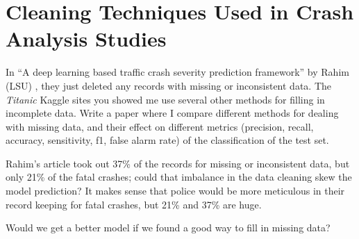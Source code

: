\section{Cleaning Techniques Used in Crash Analysis Studies}


In ``A deep learning based traffic crash severity prediction framework'' by Rahim (LSU) \cite{RAHIM2021106090}, they just deleted any records with missing or inconsistent data.  The {\it Titanic} Kaggle sites you showed me use several other methods for filling in incomplete data.  Write a paper where I compare different methods for dealing with missing data, and their effect on different metrics (precision, recall, accuracy, sensitivity, f1, false alarm rate) of the classification of the test set.  

Rahim's article took out 37\% of the records for missing or inconsistent data, but only 21\% of the fatal crashes; could that imbalance in the data cleaning skew the model prediction?  It makes sense that police would be more meticulous in their record keeping for fatal crashes, but 21\% and 37\% are huge.  

Would we get a better model if we found a good way to fill in missing data?

